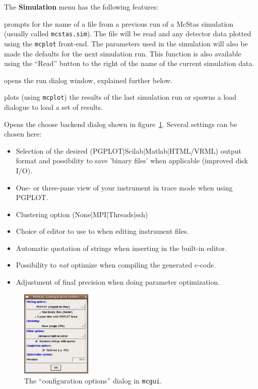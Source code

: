 \noindent The {\bf Simulation} menu has the following features:
\begin{description} 
\item[Read old simulation] prompts for the name of a file
  from a previous run of a McStas simulation (usually called
  \verb+mcstas.sim+). The file will be read and any detector data
  plotted using the \verb+mcplot+ front-end. The parameters used in the
  simulation will also be made the defaults for the next simulation
  run. This function is also available using the ``Read'' button to the
  right of the name of the current simulation data.
\item[Run simulation] opens the run dialog window, explained
  further below.
\item[Plot results] plots (using \verb+mcplot+) the results of the
  last simulation run or spawns a load dialogue to load a set of results.
\item[Configuration options] Opens the choose backend dialog shown in
  figure~\ref{fig:mcgui-choose}. Several settings can be chosen here:
\begin{itemize}
  \item Selection of  the desired (PGPLOT|Scilab|Matlab|HTML/VRML) output
    format and possibility to save 'binary files' when
  applicable (improved disk I/O).
  \item One- or three-pane view of your instrument in trace mode when
    using PGPLOT.
  \item Clustering option (None|MPI|Threads|ssh)
  \item Choice of editor to use to when editing instrument files.
  \item Automatic quotation of strings when inserting in the built-in
    editor.
  \item Possibility to \emph{not} optimize when compiling the
    generated c-code.
  \item Adjustment of final precision when doing parameter optimization.
\end{itemize}
\end{description}

\begin{figure}[htb!]
  \begin{center}
    \includegraphics[width=0.3\textwidth]{figures/choose_backend.eps}
  \end{center}
\caption{The ``configuration options'' dialog in \texttt{mcgui}.}
\label{fig:mcgui-choose}
\end{figure}



